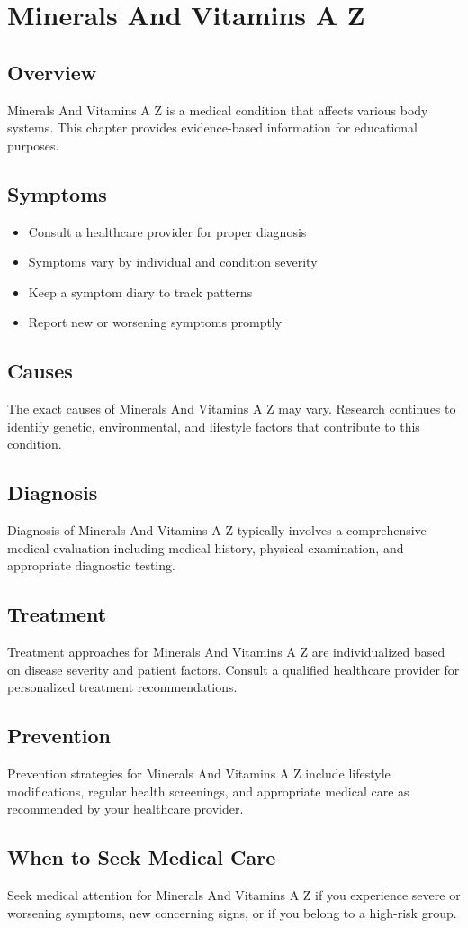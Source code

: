 \chapter{Minerals And Vitamins A Z}

\section*{Overview}
Minerals And Vitamins A Z is a medical condition that affects various body systems. This chapter provides evidence-based information for educational purposes.

\section*{Symptoms}
\begin{itemize}
  \item Consult a healthcare provider for proper diagnosis
  \item Symptoms vary by individual and condition severity
  \item Keep a symptom diary to track patterns
  \item Report new or worsening symptoms promptly
\end{itemize}

\section*{Causes}
The exact causes of Minerals And Vitamins A Z may vary. Research continues to identify genetic, environmental, and lifestyle factors that contribute to this condition.

\section*{Diagnosis}
Diagnosis of Minerals And Vitamins A Z typically involves a comprehensive medical evaluation including medical history, physical examination, and appropriate diagnostic testing.

\section*{Treatment}
Treatment approaches for Minerals And Vitamins A Z are individualized based on disease severity and patient factors. Consult a qualified healthcare provider for personalized treatment recommendations.

\section*{Prevention}
Prevention strategies for Minerals And Vitamins A Z include lifestyle modifications, regular health screenings, and appropriate medical care as recommended by your healthcare provider.

\section*{When to Seek Medical Care}
Seek medical attention for Minerals And Vitamins A Z if you experience severe or worsening symptoms, new concerning signs, or if you belong to a high-risk group.
\clearpage
